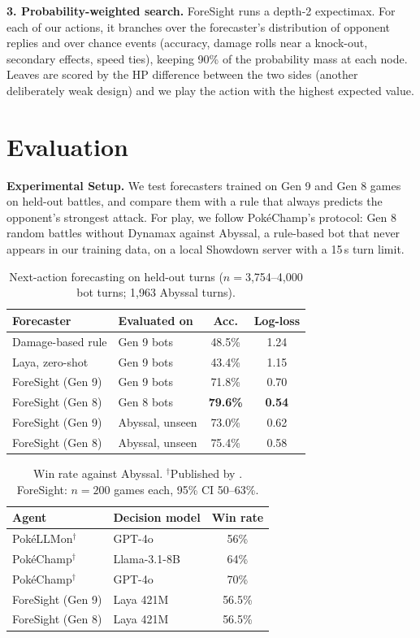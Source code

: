 \documentclass[letterpaper]{article} %
\begin{document}
\textbf{3. Probability-weighted search.} ForeSight runs a depth-2 expectimax. For each of our actions, it branches over the forecaster's distribution of opponent replies and over chance events (accuracy, damage rolls near a knock-out, secondary effects, speed ties), keeping 90\% of the probability mass at each node. Leaves are scored by the HP difference between the two sides (another deliberately weak design) and we play the action with the highest expected value.

\section{Evaluation}
\textbf{Experimental Setup.} We test forecasters trained on Gen 9 and Gen 8 games on held-out battles, and compare them with a rule that always predicts the opponent's strongest attack. For play, we follow PokéChamp's protocol: Gen 8 random battles without Dynamax against Abyssal, a rule-based bot that never appears in our training data, on a local Showdown server with a 15\,s turn limit.

\begin{table}[t]
\centering
\small
\begin{tabular}{llcc}
\toprule
Forecaster & Evaluated on & Acc. & Log-loss \\
\midrule
Damage-based rule & Gen 9 bots & 48.5\% & 1.24 \\
Laya, zero-shot & Gen 9 bots & 43.4\% & 1.15 \\
ForeSight (Gen 9) & Gen 9 bots & 71.8\% & 0.70 \\
ForeSight (Gen 8) & Gen 8 bots & \textbf{79.6\%} & \textbf{0.54} \\
\midrule
ForeSight (Gen 9) & Abyssal, unseen & 73.0\% & 0.62 \\
ForeSight (Gen 8) & Abyssal, unseen & 75.4\% & 0.58 \\
\bottomrule
\end{tabular}
\caption{Next-action forecasting on held-out turns ($n{=}$3,754--4,000 bot turns; 1,963 Abyssal turns).}
\label{tab:forecast}
\end{table}

\begin{table}[t]
\centering
\small
\begin{tabular}{llc}
\toprule
Agent & Decision model & Win rate \\
\midrule
PokéLLMon$^\dagger$ & GPT-4o & 56\% \\
PokéChamp$^\dagger$ & Llama-3.1-8B & 64\% \\
PokéChamp$^\dagger$ & GPT-4o & 70\% \\
\midrule
ForeSight (Gen 9) & Laya 421M & 56.5\% \\
ForeSight (Gen 8) & Laya 421M & 56.5\% \\
\bottomrule
\end{tabular}
\caption{Win rate against Abyssal. $^\dagger$Published by \citet{pokechamp}. ForeSight: $n{=}200$ games each, 95\% CI 50--63\%.}
\label{tab:play}
\end{table}
\end{document}
